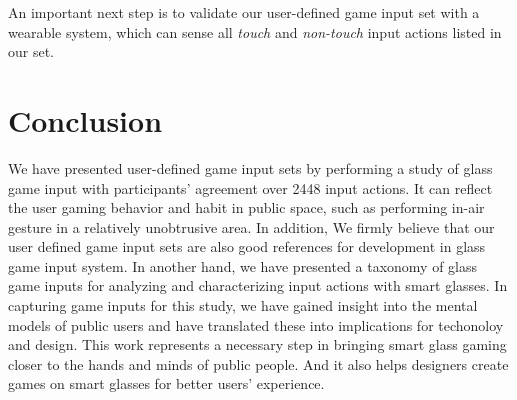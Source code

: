 \documentclass{sigchi}
\begin{document}
  An important next step is to validate our user-defined game input set with a wearable system, which can sense all \emph{touch} and \emph{non-touch} input actions listed in our set.   


\section{Conclusion}

We have presented user-defined game input sets by performing a study of glass game input with participants' agreement over 2448 input actions.
It can reflect the user gaming behavior and habit in public space, such as performing in-air gesture in a relatively unobtrusive area. In addition, We firmly believe that our user defined game input sets are also good references for development in glass game input system. In another hand, we have presented a taxonomy of glass game inputs for analyzing and characterizing input actions with smart glasses. 
In capturing game inputs for this study, we have gained insight into the mental models of public users and have translated these into implications for techonoloy and design. 
This work represents a necessary step in bringing smart glass gaming closer to the hands and minds of public people. And it also helps designers create games on smart glasses for better users' experience.



\end{document}

